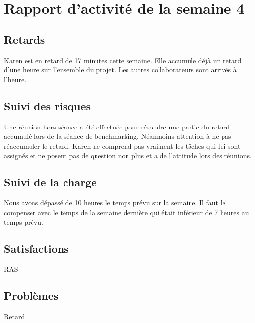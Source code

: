 \section{Rapport d'activité de la semaine 4}

\subsection{Retards}

Karen est en retard de 17 minutes cette semaine. Elle accumule déjà un retard 
d'une heure sur l'ensemble du projet. Les autres collaborateurs sont arrivés
à l'heure.

\subsection{Suivi des risques}

Une réunion hors séance a été effectuée pour résoudre une partie du retard
accumulé lors de la séance de benchmarking. Néanmoins attention à ne pas réaccumuler
le retard. Karen ne comprend pas vraiment les tâches qui lui sont assignés et ne 
posent pas de question non plus et a de l'attitude lors des réunions.

\subsection{Suivi de la charge}

Nous avons dépassé de 10 heures le temps prévu sur la semaine. Il faut
le compenser avec le temps de la semaine dernière qui était inférieur de 7 heures
au temps prévu.


\subsection{Satisfactions}

RAS

\subsection{Problèmes}

Retard
